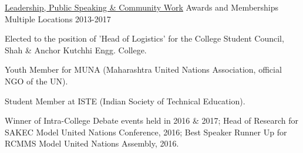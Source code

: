 


\begin{cventries}



\cventry
{\underline {Leadership, Public Speaking \& Community Work}} %
{Awards and Memberships} %
{Multiple Locations} %
{2013-2017} %
{ %
\begin{cvitems}
\item {Elected to the position of 'Head of Logistics' for the College Student Council, Shah \& Anchor Kutchhi Engg. College.}
\item {Youth Member for MUNA (Maharashtra United Nations Association, official NGO of the UN).}
\item {Student Member at ISTE (Indian Society of Technical Education).}
\item {Winner of Intra-College Debate events held in 2016 \& 2017; Head of Research for SAKEC Model United Nations Conference, 2016; Best Speaker Runner Up for RCMMS Model United Nations Assembly, 2016.}
\end{cvitems}
\vspace{-1.75\baselineskip} 
}


\end{cventries}
